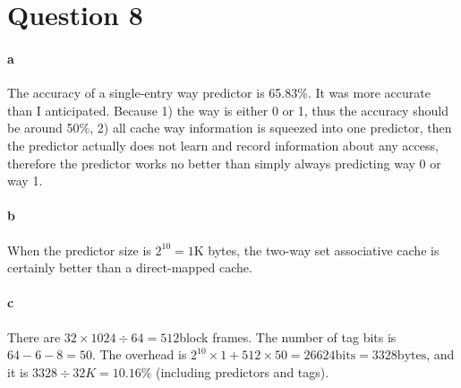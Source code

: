 \documentclass[12pt,letterpaper]{article}
\begin{document}
\section*{Question 8}
\paragraph*{a}
The accuracy of a single-entry way predictor is 65.83\%. It was more accurate than I anticipated.
Because 1) the way is either 0 or 1, thus the accuracy should be around 50\%, 2) all cache way 
information is squeezed into one predictor, then the predictor actually does not learn and 
record information about any access, therefore the predictor works no better than simply
always predicting way 0 or way 1.
\paragraph*{b}
When the predictor size is $2^{10}=1$K bytes, the two-way set associative cache is certainly
better than a direct-mapped cache.
\paragraph*{c}
There are $32\times1024\div64=512$block frames. The number of tag bits is $64-6-8=50$. 
The overhead is $2^{10}\times1+512\times50=26624\mbox{bits}=3328\mbox{bytes}$, and it 
is $3328\div32K=10.16\%$ (including predictors and tags).
\end{document}

